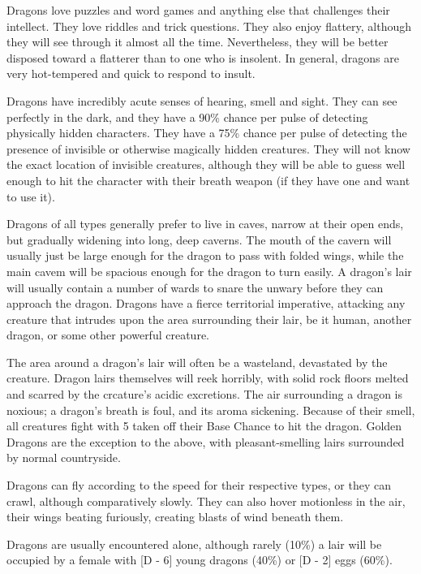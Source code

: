 \begin{multicols*}{2}
Dragons love puzzles and word games and anything else that challenges
their intellect.  They love riddles and trick questions.  They also
enjoy flattery, although they will see through it almost all the
time. Nevertheless, they will be better disposed toward a flatterer
than to one who is insolent.  In general, dragons are very
hot-tempered and quick to respond to insult.

Dragons have incredibly acute senses of hearing, smell and sight. They
can see perfectly in the dark, and they have a 90\% chance per pulse of
detecting physically hidden characters.  They have a 75\% chance per
pulse of detecting the presence of invisible or otherwise magically
hidden creatures.  They will not know the exact location of invisible
creatures, although they will be able to guess well enough to hit the
character with their breath weapon (if they have one and want to use
it).

Dragons of all types generally prefer to live in caves, narrow at
their open ends, but gradually widening into long, deep caverns.  The
mouth of the cavern will usually just be large enough for the dragon
to pass with folded wings, while the main cavem will be spacious
enough for the dragon to turn easily.  A dragon's lair will usually
contain a number of wards to snare the unwary before they can approach
the dragon.  Dragons have a fierce territorial imperative, attacking
any creature that intrudes upon the area surrounding their lair, be it
human, another dragon, or some other powerful creature.

The area around a dragon's lair will often be a wasteland, devastated
by the creature.  Dragon lairs themselves will reek horribly, with
solid rock floors melted and scarred by the crcature's acidic
excretions.  The air surrounding a dragon is noxious; a dragon's
breath is foul, and its aroma sickening.  Because of their smell, all
creatures fight with 5 taken off their Base Chance to hit the dragon.
Golden Dragons are the exception to the above, with pleasant-smelling
lairs surrounded by normal countryside.

Dragons can fly according to the speed for their respective types, or
they can crawl, although comparatively slowly.  They can also hover
motionless in the air, their wings beating furiously, creating blasts
of wind beneath them.

Dragons are usually encountered alone, although rarely (10\%) a lair
will be occupied by a female with [D - 6] young dragons (40\%) or [D -
2] eggs (60\%).


\end{multicols*}

